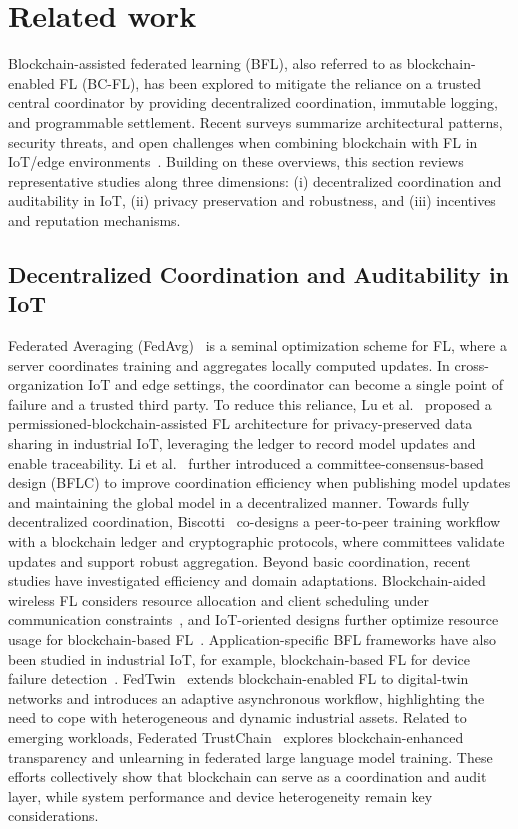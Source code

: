 \documentclass[a4paper]{cas-dc}
\begin{document}
\section{Related work}\label{sec:2}
Blockchain-assisted federated learning (BFL), also referred to as blockchain-enabled FL (BC-FL),
has been explored to mitigate the reliance on a trusted central coordinator by providing decentralized
coordination, immutable logging, and programmable settlement. Recent surveys summarize architectural
patterns, security threats, and open challenges when combining blockchain with FL in IoT/edge
environments~\cite{1,3}. Building on these overviews, this section reviews representative studies
along three dimensions: (i) decentralized coordination and auditability in IoT, (ii) privacy
preservation and robustness, and (iii) incentives and reputation mechanisms.
\subsection{Decentralized Coordination and Auditability in IoT}
Federated Averaging (FedAvg)~\cite{18} is a seminal optimization scheme for FL, where a server
coordinates training and aggregates locally computed updates. In cross-organization IoT and edge
settings, the coordinator can become a single point of failure and a trusted third party. To reduce
this reliance, Lu et al.~\cite{28} proposed a permissioned-blockchain-assisted FL architecture for
privacy-preserved data sharing in industrial IoT, leveraging the ledger to record model updates and
enable traceability. Li et al.~\cite{4} further introduced a committee-consensus-based design (BFLC)
to improve coordination efficiency when publishing model updates and maintaining the global model in a
decentralized manner. Towards fully decentralized coordination, Biscotti~\cite{66} co-designs a
peer-to-peer training workflow with a blockchain ledger and cryptographic protocols, where committees
validate updates and support robust aggregation.
Beyond basic coordination, recent studies have investigated efficiency and domain adaptations.
Blockchain-aided wireless FL considers resource allocation and client scheduling under communication
constraints~\cite{67}, and IoT-oriented designs further optimize resource usage for blockchain-based
FL~\cite{9}. Application-specific BFL frameworks have also been studied in industrial IoT,
for example, blockchain-based FL for device failure detection~\cite{6}. FedTwin~\cite{41} extends
blockchain-enabled FL to digital-twin networks and introduces an adaptive asynchronous workflow,
highlighting the need to cope with heterogeneous and dynamic industrial assets. Related to emerging
workloads, Federated TrustChain~\cite{58} explores blockchain-enhanced transparency and unlearning in
federated large language model training. These efforts collectively show that blockchain can serve as
a coordination and audit layer, while system performance and device heterogeneity remain key
considerations.
\end{document}
